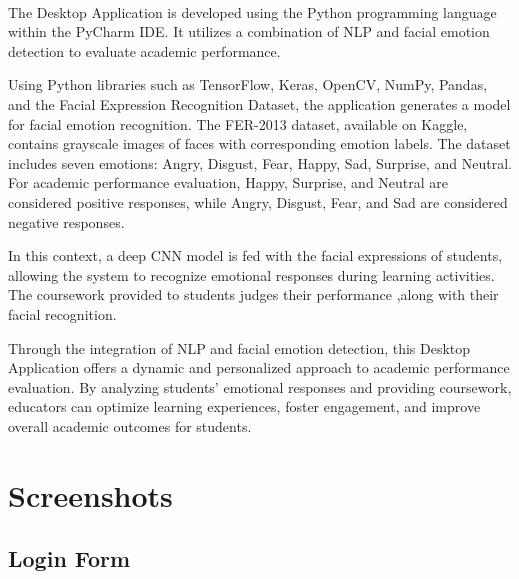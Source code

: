 \paragraph{} The Desktop Application is developed using the Python programming language within the PyCharm IDE. It utilizes a combination of NLP and facial emotion detection to evaluate academic performance.

\par Using Python libraries such as TensorFlow, Keras, OpenCV, NumPy, Pandas, and the Facial Expression Recognition Dataset, the application generates a model for facial emotion recognition. The FER-2013 dataset, available on Kaggle, contains grayscale images of faces with corresponding emotion labels. The dataset includes seven emotions: Angry, Disgust, Fear, Happy, Sad, Surprise, and Neutral. For academic performance evaluation, Happy, Surprise, and Neutral are considered positive responses, while Angry, Disgust, Fear, and Sad are considered negative responses.

\par In this context, a deep CNN model is fed with the facial expressions of students, allowing the system to recognize emotional responses during learning activities. The coursework provided to students judges their performance ,along with their facial recognition.

\par Through the integration of NLP and facial emotion detection, this Desktop Application offers a dynamic and personalized approach to academic performance evaluation. By analyzing students' emotional responses and providing coursework, educators can optimize learning experiences, foster engagement, and improve overall academic outcomes for students.



\section{Screenshots}
\subsection{Login Form}
